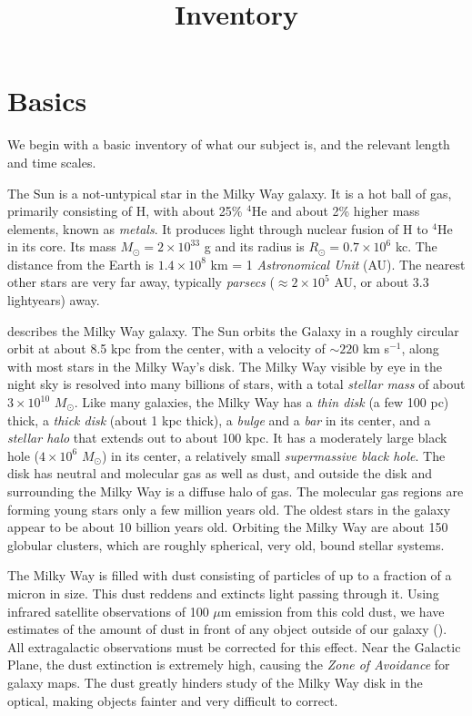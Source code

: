 \title{\bf Inventory}

\section{Basics}

We begin with a basic inventory of what our subject is, and the
relevant length and time scales.

The Sun is a not-untypical star in the Milky Way galaxy. It is a hot
ball of gas, primarily consisting of H, with about 25\% ${}^4$He and
about 2\% higher mass elements, known as {\it metals}. It produces
light through nuclear fusion of H to ${}^4$He in its core. Its mass
$M_\odot = 2\times 10^{33}$ g and its radius is $R_\odot = 0.7 \times
10^6$ kc. The distance from the Earth is $1.4\times 10^8$ km = 1 {\it
  Astronomical Unit} (AU). The nearest other stars are very far away,
typically {\it parsecs} ($\approx 2 \times 10^5$ AU, or about 3.3
lightyears) away.

\citet{blandhawthorn16a} describes the Milky Way galaxy. The Sun
orbits the Galaxy in a roughly circular orbit at about 8.5 kpc from
the center, with a velocity of $\sim 220$ km s$^{-1}$, along with most
stars in the Milky Way's disk. The Milky Way visible by eye in the
night sky is resolved into many billions of stars, with a total {\it
stellar mass} of about $3\times 10^{10}$ $M_\odot$. Like many
galaxies, the Milky Way has a {\it thin disk} (a few 100 pc) thick, a
{\it thick disk} (about 1 kpc thick), a {\it bulge} and a {\it bar} in
its center, and a {\it stellar halo} that extends out to about 100
kpc. It has a moderately large black hole ($4\times 10^6$ $M_\odot$)
in its center, a relatively small {\it supermassive black hole}. The
disk has neutral and molecular gas as well as dust, and outside the
disk and surrounding the Milky Way is a diffuse halo of gas. The
molecular gas regions are forming young stars only a few million years
old. The oldest stars in the galaxy appear to be about 10 billion
years old. Orbiting the Milky Way are about 150 globular clusters,
which are roughly spherical, very old, bound stellar systems.

The Milky Way is filled with dust consisting of particles of up to a
fraction of a micron in size. This dust reddens and extincts light
passing through it. Using infrared satellite observations of 100
$\mu$m emission from this cold dust, we have estimates of the amount
of dust in front of any object outside of our galaxy
(\citealt{schlegel98a}). All extragalactic observations must be
corrected for this effect. Near the Galactic Plane, the dust
extinction is extremely high, causing the {\it Zone of Avoidance} for
galaxy maps. The dust greatly hinders study of the Milky Way disk in
the optical, making objects fainter and very difficult to correct.

